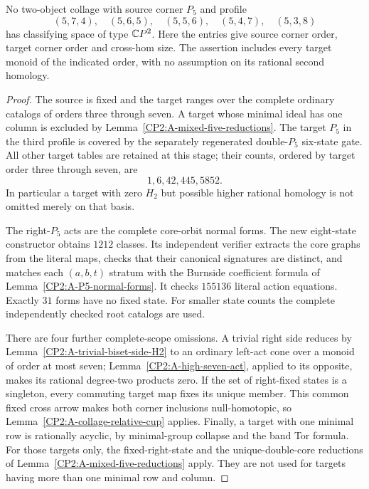 \begin{proposition}
\label{CP2:A-P5-source-sixteen}
No two-object collage with source corner $P_5$ and profile
\[
(5,7,4),\quad(5,6,5),\quad(5,5,6),\quad(5,4,7),\quad(5,3,8)
\]
has classifying space of type $\mathbb{C}P^2$. Here the entries give
source corner order, target corner order and cross-hom size.
The assertion includes every target monoid of the indicated
order, with no assumption on its rational second homology.
\end{proposition}
\begin{proof}
The source is fixed and the target ranges over the complete
ordinary catalogs of orders three through seven. A target
whose minimal ideal has one column is excluded by
Lemma~\ref{CP2:A-mixed-five-reductions}. The target $P_5$
in the third profile is covered by the separately regenerated
double-$P_5$ six-state gate. All other target tables are retained
at this stage; their counts, ordered by target order three
through seven, are
\[
1,6,42,445,5852.
\]
In particular a target with zero $H_2$ but possible higher
rational homology is not omitted merely on that basis.

The right-$P_5$ acts are the complete core-orbit normal forms.
The new eight-state constructor
 obtains $1212$
classes. Its independent verifier extracts the core graphs
from the literal maps, checks that their canonical signatures
are distinct, and matches each $(a,b,t)$ stratum with the
Burnside coefficient formula of
Lemma~\ref{CP2:A-P5-normal-forms}. It checks $155136$ literal
action equations. Exactly $31$ forms have no fixed state.
For smaller state counts the complete independently checked
root catalogs are used.

There are four further complete-scope omissions. A trivial
right side reduces by Lemma~\ref{CP2:A-trivial-biset-side-H2}
to an ordinary left-act cone over a monoid of order at most
seven; Lemma~\ref{CP2:A-high-seven-act}, applied to its
opposite, makes its rational degree-two products zero.
If the set of right-fixed states is a singleton, every
commuting target map fixes its unique member. This common
fixed cross arrow makes both corner inclusions null-homotopic,
so Lemma~\ref{CP2:A-collage-relative-cup} applies.
Finally, a target with one minimal row is rationally acyclic,
by minimal-group collapse and the band Tor formula. For those
targets only, the fixed-right-state and the unique-double-core
reductions of Lemma~\ref{CP2:A-mixed-five-reductions} apply.
They are not used for targets having more than one minimal
row and column.


\end{proof}
